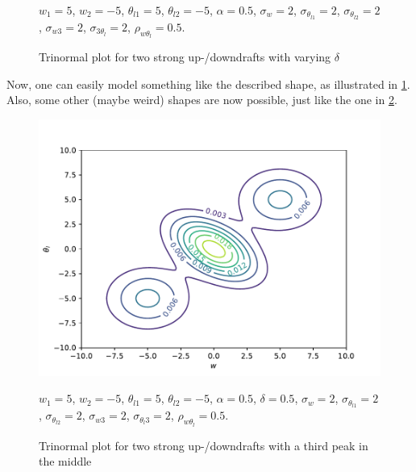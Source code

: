 \begin{figure}[!htb]
\begin{tabular}{cc}
    \end{tabular}
    \caption{Trinormal plot for two strong up-/downdrafts with varying $\delta$}
    \label{fig:plot3}
    $w_1 = 5$, $w_2 = -5$, $\theta_{l1} = 5$, $\theta_{l2} = -5$,
    $\alpha = 0.5$, $\sigma_w = 2$, $\sigma_{\theta_{l1}} = 2$,  $\sigma_{\theta_{l2}} = 2$,
    $\sigma_{w3} = 2$, $\sigma_{3\theta_l} = 2$, $\rho_{w\theta_l} = 0.5$.
\end{figure}
Now, one can easily model something like the described shape,
as illustrated in \cref{fig:plot3}.
Also, some other (maybe weird) shapes are now possible,
just like the one in \cref{fig:plot4}.
\begin{figure}[!htb]
    \centering
    \includegraphics[width=.5\textwidth]{include/figures/plot4}
    \caption{Trinormal plot for two strong up-/downdrafts with a third peak in the middle}
    \label{fig:plot4}
    $w_1 = 5$, $w_2 = -5$, $\theta_{l1} = 5$, $\theta_{l2} = -5$,
    $\alpha = 0.5$, $\delta=0.5$, $\sigma_w = 2$, $\sigma_{\theta_{l1}} = 2$,
    $\sigma_{\theta_{l2}} = 2$, $\sigma_{w3} = 2$, $\sigma_{\theta_l 3} = 2$,
    $\rho_{w\theta_l} = 0.5$.
\end{figure}
